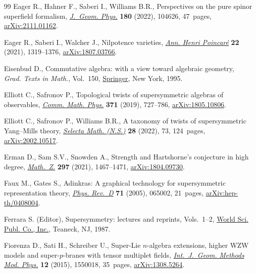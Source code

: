 \documentclass[pdftex]{sigma}
\numberwithin{equation}{section}
\begin{document}
\begin{thebibliography}{99}
Eager R., Hahner F., Saberi I., Williams B.R., Perspectives on the pure spinor
 superfield formalism, \href{https://doi.org/10.1016/j.geomphys.2022.104626}{\textit{J.~Geom. Phys.}} \textbf{180} (2022), 104626,
 47~pages, \href{https://arxiv.org/abs/2111.01162}{arXiv:2111.01162}.

Eager R., Saberi I., Walcher J., Nilpotence varieties, \href{https://doi.org/10.1007/s00023-020-01007-y}{\textit{Ann. Henri
 Poincar\'e}} \textbf{22} (2021), 1319--1376, \href{https://arxiv.org/abs/1807.03766}{arXiv:1807.03766}.

Eisenbud D., Commutative algebra: with a view toward algebraic geometry,
 \textit{Grad. Texts in Math.}, Vol.~150, \href{https://doi.org/10.1007/978-1-4612-5350-1}{Springer}, New York, 1995.

Elliott C., Safronov P., Topological twists of supersymmetric algebras of
 observables, \href{https://doi.org/10.1007/s00220-019-03393-9}{\textit{Comm. Math. Phys.}} \textbf{371} (2019), 727--786,
 \href{https://arxiv.org/abs/1805.10806}{arXiv:1805.10806}.

Elliott C., Safronov P., Williams B.R., A taxonomy of twists of supersymmetric
 {Y}ang--{M}ills theory, \href{https://doi.org/10.1007/s00029-022-00786-y}{\textit{Selecta Math. (N.S.)}} \textbf{28} (2022), 73,
 124~pages, \href{https://arxiv.org/abs/2002.10517}{arXiv:2002.10517}.

Erman D., Sam S.V., Snowden A., Strength and {H}artshorne's conjecture in high
 degree, \href{https://doi.org/10.1007/s00209-020-02564-y}{\textit{Math.~Z.}} \textbf{297} (2021), 1467--1471,
 \href{https://arxiv.org/abs/1804.09730}{arXiv:1804.09730}.

Faux M., Gates S., Adinkras: A graphical technology for supersymmetric
 representation theory, \href{https://link.aps.org/doi/10.1103/PhysRevD.71.065002}{\textit{Phys. Rev.~D}} \textbf{71} (2005), 065002,
 21~pages, \href{https://arxiv.org/abs/hep-th/0408004}{arXiv:hep-th/0408004}.

Ferrara S. (Editor), Supersymmetry: lectures and reprints, Vols.~1--2, \href{https://doi.org/10.1142/0091}{World
 Sci. Publ. Co., Inc.}, Teaneck, NJ, 1987.

Fiorenza D., Sati H., Schreiber U., Super-{L}ie {$n$}-algebra extensions,
 higher {WZW} models and super-{$p$}-branes with tensor multiplet fields,
 \href{https://doi.org/10.1142/S0219887815500188}{\textit{Int.~J.~Geom. Methods Mod. Phys.}} \textbf{12} (2015), 1550018,
 35~pages, \href{https://arxiv.org/abs/1308.5264}{arXiv:1308.5264}.


\end{thebibliography}
\end{document}
